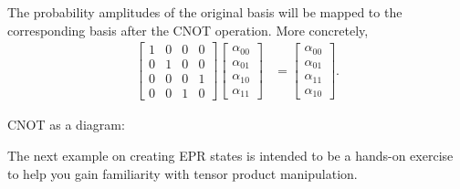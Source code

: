 The probability amplitudes of the original basis will be mapped to the corresponding basis after the CNOT operation. More concretely,
\begin{align*}
    \begin{bmatrix}
        1 & 0 & 0 & 0 \\
        0 & 1 & 0 & 0 \\
        0 & 0 & 0 & 1 \\
        0 & 0 & 1 & 0
    \end{bmatrix} \begin{bmatrix}
        \alpha_{00} \\ \alpha_{01} \\ \alpha_{10} \\ \alpha_{11}
    \end{bmatrix} &= \begin{bmatrix}
        \alpha_{00} \\ \alpha_{01} \\ \alpha_{11} \\ \alpha_{10}
    \end{bmatrix}.
\end{align*}

CNOT as a diagram:
\begin{center}
\end{center}

The next example on creating EPR states is intended to be a hands-on exercise to help you gain familiarity with tensor product manipulation.


